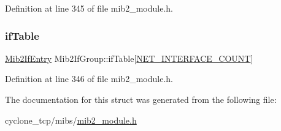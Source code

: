Definition at line 345 of file mib2\+\_\+module.\+h.

\mbox{\label{structMib2IfGroup_a2571ddd0d5455c9de70e465ae8f34369}} 
\subsubsection{\texorpdfstring{if\+Table}{ifTable}}
{\footnotesize\ttfamily \hyperlink{structMib2IfEntry}{Mib2\+If\+Entry} Mib2\+If\+Group\+::if\+Table\mbox{[}\hyperlink{net__config_8h_a116f850ebcb023ffa3e6b8de10c5cb35}{N\+E\+T\+\_\+\+I\+N\+T\+E\+R\+F\+A\+C\+E\+\_\+\+C\+O\+U\+NT}\mbox{]}}



Definition at line 346 of file mib2\+\_\+module.\+h.



The documentation for this struct was generated from the following file\+:\begin{DoxyCompactItemize}
\item 
cyclone\+\_\+tcp/mibs/\hyperlink{mib2__module_8h}{mib2\+\_\+module.\+h}\end{DoxyCompactItemize}
